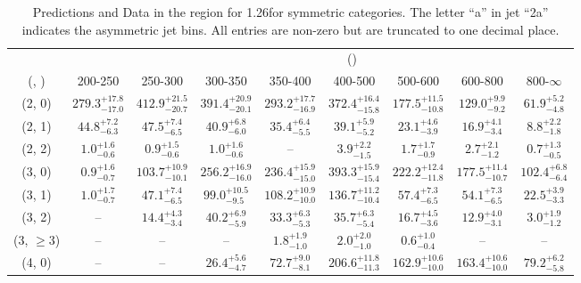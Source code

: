 \begin{table}[h!]
\tiny
\centering
\caption{Predictions and Data in the \mj region for 1.26\ifb for symmetric categories. The letter ``a'' in jet \eg ``2a''  indicates the asymmetric jet bins. All entries are non-zero but are truncated to one decimal place.\label{tab:prednodata_mu_comb_sym}}
\begin{tabular}
{ccccccccc}
	\hline\hline
&	& \multicolumn{8}{c}{\scalht (\gev)} \\ 
	 (\njet,  \nb) & 200-250 & 250-300 & 300-350 & 350-400 & 400-500 & 500-600 & 600-800 & 800-$\infty$ \\ [0.8ex] 
\hline
	(2, 0) & $279.3^{+ 17.8 }_{- 17.0 }$ & $412.9^{+ 21.5 }_{- 20.7 }$ & $391.4^{+ 20.9 }_{- 20.1 }$ & $293.2^{+ 17.7 }_{- 16.9 }$ & $372.4^{+ 16.4 }_{- 15.8 }$ & $177.5^{+ 11.5 }_{- 10.8 }$ & $129.0^{+ 9.9 }_{- 9.2 }$ & $61.9^{+ 5.2 }_{- 4.8 }$ \\[0.5ex] 
	(2, 1) & $44.8^{+ 7.2 }_{- 6.3 }$ & $47.5^{+ 7.4 }_{- 6.5 }$ & $40.9^{+ 6.8 }_{- 6.0 }$ & $35.4^{+ 6.4 }_{- 5.5 }$ & $39.1^{+ 5.9 }_{- 5.2 }$ & $23.1^{+ 4.6 }_{- 3.9 }$ & $16.9^{+ 4.1 }_{- 3.4 }$ & $8.8^{+ 2.2 }_{- 1.8 }$ \\[0.5ex] 
	(2, 2) & $1.0^{+ 1.6 }_{- 0.6 }$ & $0.9^{+ 1.5 }_{- 0.6 }$ & $1.0^{+ 1.6 }_{- 0.6 }$ & -- & $3.9^{+ 2.2 }_{- 1.5 }$ & $1.7^{+ 1.7 }_{- 0.9 }$ & $2.7^{+ 2.1 }_{- 1.2 }$ & $0.7^{+ 1.3 }_{- 0.5 }$ \\[0.5ex] 
	(3, 0) & $0.9^{+ 1.6 }_{- 0.7 }$ & $103.7^{+ 10.9 }_{- 10.1 }$ & $256.2^{+ 16.9 }_{- 16.0 }$ & $236.4^{+ 15.9 }_{- 15.0 }$ & $393.3^{+ 15.9 }_{- 15.4 }$ & $222.2^{+ 12.4 }_{- 11.8 }$ & $177.5^{+ 11.4 }_{- 10.7 }$ & $102.4^{+ 6.8 }_{- 6.4 }$ \\[0.5ex] 
	(3, 1) & $1.0^{+ 1.7 }_{- 0.7 }$ & $47.1^{+ 7.4 }_{- 6.5 }$ & $99.0^{+ 10.5 }_{- 9.5 }$ & $108.2^{+ 10.9 }_{- 10.0 }$ & $136.7^{+ 11.2 }_{- 10.4 }$ & $57.4^{+ 7.3 }_{- 6.5 }$ & $54.1^{+ 7.3 }_{- 6.5 }$ & $22.5^{+ 3.9 }_{- 3.3 }$ \\[0.5ex] 
	(3, 2) & -- & $14.4^{+ 4.3 }_{- 3.4 }$ & $40.2^{+ 6.9 }_{- 5.9 }$ & $33.3^{+ 6.3 }_{- 5.3 }$ & $35.7^{+ 6.3 }_{- 5.4 }$ & $16.7^{+ 4.5 }_{- 3.6 }$ & $12.9^{+ 4.0 }_{- 3.1 }$ & $3.0^{+ 1.9 }_{- 1.2 }$ \\[0.5ex] 
	(3, $\ge3$) & -- & -- & -- & $1.8^{+ 1.9 }_{- 1.0 }$ & $2.0^{+ 2.0 }_{- 1.0 }$ & $0.6^{+ 1.0 }_{- 0.4 }$ & -- & -- \\[0.5ex] 
	(4, 0) & -- & -- & $26.4^{+ 5.6 }_{- 4.7 }$ & $72.7^{+ 9.0 }_{- 8.1 }$ & $206.6^{+ 11.8 }_{- 11.3 }$ & $162.9^{+ 10.6 }_{- 10.0 }$ & $163.4^{+ 10.6 }_{- 10.0 }$ & $79.2^{+ 6.2 }_{- 5.8 }$ \\[0.5ex] 

\end{tabular}
\end{table}
